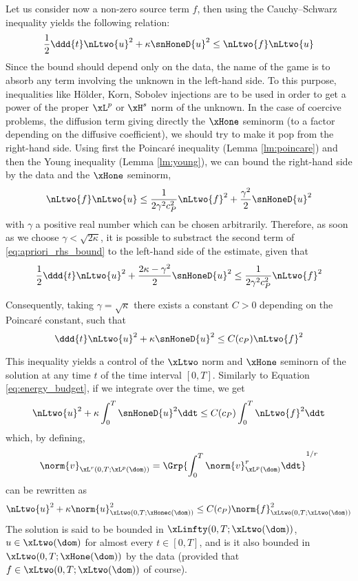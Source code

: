 \medskip
Let us consider now a non-zero source term $f$, then using the Cauchy--Schwarz inequality yields the following relation:
\begin{equation}
\dfrac{1}{2} \ddd{t} \nLtwo{u}^2 + \kappa \snHoneD{u}^2 \leq \nLtwo{f} \nLtwo{u}
\end{equation}
Since the bound should depend only on the data, the name of the game is to absorb any term involving the unknown in the left-hand side.
To this purpose, inequalities like Hölder, Korn, Sobolev injections are to be used in order to get a power of the proper $\xL^p$ or $\xH^s$ norm of the unknown.
In the case of coercive problems, the diffusion term giving directly the $\xHone$ seminorm (to a factor depending on the diffusive coefficient), we should try to make it pop from the right-hand side.
Using first the Poincaré inequality (Lemma \ref{lm:poincare}) and then the Young inequality (Lemma \ref{lm:young}), we can bound the right-hand side by the data and the $\xHone$ seminorm,
\begin{equation}\label{eq:apriori_rhs_bound}
\nLtwo{f} \nLtwo{u} \leq \dfrac{1}{2 \gamma^2 c_P^2} \nLtwo{f}^2 + \dfrac{\gamma^2}{2}\snHoneD{u}^2
\end{equation}
with $\gamma$ a positive real number which can be chosen arbitrarily.
Therefore, as soon as we choose $\gamma < \sqrt{2 \kappa}$, it is possible to substract the second term of \eqref{eq:apriori_rhs_bound} to the left-hand side of the estimate, given that
\begin{equation}
\dfrac{1}{2} \ddd{t} \nLtwo{u}^2 + \dfrac{2\kappa - \gamma^2}{2}  \snHoneD{u}^2 \leq \dfrac{1}{2 \gamma^2 c_P^2} \nLtwo{f}^2
\end{equation}

Consequently, taking $\gamma= \sqrt{\kappa}$ there exists a constant $C > 0$ depending on the Poincaré constant, such that
\begin{equation}
\ddd{t} \nLtwo{u}^2 + \kappa  \snHoneD{u}^2 \leq C(c_P) \nLtwo{f}^2
\end{equation}

This inequality yields a control of the $\xLtwo$ norm and $\xHone$ seminorn of the solution at any time $t$ of the time interval $[0,T]$.
Similarly to Equation \eqref{eq:energy_budget}, if we integrate over the time, we get
\begin{equation*}
\nLtwo{u}^2 + \kappa \int_{0}^T \snHoneD{u}^2 \ddt \leq C(c_P) \int_{0}^T \nLtwo{f}^2 \ddt
\end{equation*}
which, by defining,
\begin{equation}
\norm{v}_{\xL^{r}(0,T;\xL^{p}(\dom))} = \Grp{\int_{0}^T \norm{v}_{\xL^p(\dom)}^{r} \ddt}^{1/r}
\end{equation}
can be rewritten as
\begin{equation*}
\nLtwo{u}^2 + \kappa \norm{u}_{\xLtwo(0,T;\xHonec(\dom))}^2 \leq C(c_P) \norm{f}_{\xLtwo(0,T;\xLtwo(\dom))}^2
\end{equation*}
The solution is said to be bounded in $\xLinfty(0,T;\xLtwo(\dom))$, \ie $u \in \xLtwo(\dom)$ for almost every $t \in [0,T]$, and is it also bounded in $\xLtwo(0,T;\xHone(\dom))$ by the data (provided that $f \in \xLtwo(0,T;\xLtwo(\dom))$ of course).

